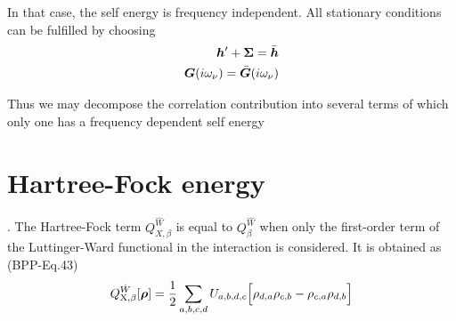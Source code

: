 \documentclass[11pt,a4paper]{report}
\begin{document}
In that case, the self energy is frequency independent. All stationary
conditions can be fulfilled by choosing
\begin{eqnarray}
\bm{h}'+\bm{\Sigma}=\bar{\bm{h}}
\nonumber\\
\bm{G}(i\omega_\nu)=\bar{\bm{G}}(i\omega_\nu)
\end{eqnarray}

Thus we may decompose the correlation contribution into several terms
of which only one has a frequency dependent self energy


\chapter{Hartree-Fock energy}
\label{app:hfcontrib}.
The Hartree-Fock term $Q^{\hat{W}}_{X,\beta}$ is equal to
$Q^{\hat{W}}_\beta$ when only the first-order term of the
Luttinger-Ward functional in the interaction is considered.  It is
obtained as (BPP-Eq.43)
\begin{eqnarray}
Q_{\text{X},\beta}^{\hat{W}}[\bm{\rho}]
=\frac{1}{2}\sum_{a,b,c,d}U_{a,b,d,c}
\Bigl[\rho_{d,a}\rho_{c,b}-\rho_{c,a}\rho_{d,b}\Bigr]
\end{eqnarray}
\end{document}
